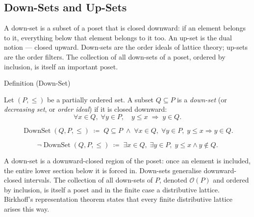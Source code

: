 
\subsection{Down-Sets and Up-Sets}
\label{sec:down-up-sets}

\begin{remark*}
A down-set is a subset of a poset that is closed downward: if an element
belongs to it, everything below that element belongs to it too.  An up-set
is the dual notion --- closed upward.  Down-sets are the order ideals of
lattice theory; up-sets are the order filters.  The collection of all
down-sets of a poset, ordered by inclusion, is itself an important poset.
\end{remark*}


\begin{definitionbox}{Definition (Down-Set)}
\begin{definition}
\label{def:down-set}
Let $(P, \leq)$ be a partially ordered set.  A subset $Q \subseteq P$ is
a \emph{down-set} (or \emph{decreasing set}, or \emph{order ideal}) if it
is closed downward:
\[
\forall x \in Q,\; \forall y \in P,\quad y \leq x \;\Longrightarrow\; y \in Q.
\]
\end{definition}
\end{definitionbox}

\begin{remark*}
\[
\operatorname{DownSet}(Q, P, \leq)
\;\coloneqq\;
Q \subseteq P
\;\land\;
\forall x \in Q,\; \forall y \in P,\;
y \leq x \Rightarrow y \in Q.
\]
\end{remark*}

\begin{remark*}
\[
\neg\operatorname{DownSet}(Q, P, \leq)
\;\coloneqq\;
\exists x \in Q,\; \exists y \in P,\;
y \leq x \land y \notin Q.
\]
\end{remark*}

\begin{remark*}[Interpretation]
A down-set is a downward-closed region of the poset: once an element is
included, the entire lower section below it is forced in.  Down-sets
generalise downward-closed intervals.  The collection of all down-sets of
$P$, denoted $\mathcal{O}(P)$ and ordered by inclusion, is itself a poset
and in the finite case a distributive lattice.  Birkhoff's representation
theorem states that every finite distributive lattice arises this way.
\end{remark*}

